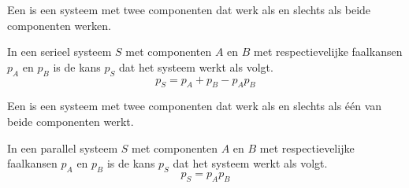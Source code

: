 \documentclass[main.tex]{subfiles}
\begin{document}
\begin{de}
  Een  is een systeem met twee componenten dat werk als en slechts als beide componenten werken.
\end{de}

\begin{st}
  In een serieel systeem $S$ met componenten $A$ en $B$ met respectievelijke faalkansen $p_{A}$ en $p_{B}$ is de kans $p_{S}$ dat het systeem werkt als volgt.
  \[ p_{S} = p_{A} + p_{B} -p_{A}p_{B} \]
\end{st}

\begin{de}
  Een  is een systeem met twee componenten dat werk als en slechts als \'e\'en van beide componenten werkt.
\end{de}

\begin{st}
  In een parallel systeem $S$ met componenten $A$ en $B$ met respectievelijke faalkansen $p_{A}$ en $p_{B}$ is de kans $p_{S}$ dat het systeem werkt als volgt.
  \[ p_{S} = p_{A}p_{B} \]
\end{st}
\end{document}

